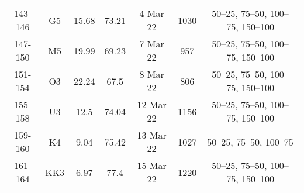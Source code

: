 \documentclass{article}
\begin{document}
\begin{table}[htbp]
{\begin{adjustwidth}{0in}{0in}
\begin{tabular}{ccccccc}
				143-146       & G5  & 15.68      & 73.21      & 4 Mar 22                  & 1030       & 50–25, 75–50, 100–75, 150–100 \\
				147-150       & M5  & 19.99      & 69.23      & 7 Mar 22                  & 957        & 50–25, 75–50, 100–75, 150–100 \\
				151-154       & O3  & 22.24      & 67.5       & 8 Mar 22                  & 806        & 50–25, 75–50, 100–75, 150–100 \\
				155-158       & U3  & 12.5       & 74.04      & 12 Mar 22                 & 1156       & 50–25, 75–50, 100–75, 150–100 \\
				159-160       & K4  & 9.04       & 75.42      & 13 Mar 22                 & 1027       & 50–25, 75–50, 100–75          \\
				161-164       & KK3 & 6.97       & 77.4       & 15 Mar 22                 & 1220       & 50–25, 75–50, 100–75, 150–100
				\\ 
				\bottomrule
			\end{tabular}
		\end{adjustwidth}
		\label{tab:table2}
	}
\end{table}
\end{document}
